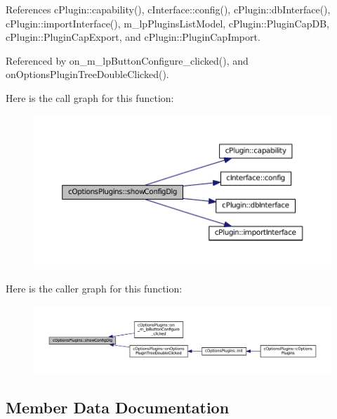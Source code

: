 References c\+Plugin\+::capability(), c\+Interface\+::config(), c\+Plugin\+::db\+Interface(), c\+Plugin\+::import\+Interface(), m\+\_\+lp\+Plugins\+List\+Model, c\+Plugin\+::\+Plugin\+Cap\+DB, c\+Plugin\+::\+Plugin\+Cap\+Export, and c\+Plugin\+::\+Plugin\+Cap\+Import.



Referenced by on\+\_\+m\+\_\+lp\+Button\+Configure\+\_\+clicked(), and on\+Options\+Plugin\+Tree\+Double\+Clicked().



Here is the call graph for this function\+:
\nopagebreak
\begin{figure}[H]
\begin{center}
\leavevmode
\includegraphics[width=350pt]{classc_options_plugins_a102ea2333b1b8cdb69135dbd2ca10bed_cgraph}
\end{center}
\end{figure}




Here is the caller graph for this function\+:
\nopagebreak
\begin{figure}[H]
\begin{center}
\leavevmode
\includegraphics[width=350pt]{classc_options_plugins_a102ea2333b1b8cdb69135dbd2ca10bed_icgraph}
\end{center}
\end{figure}




\subsection{Member Data Documentation}
